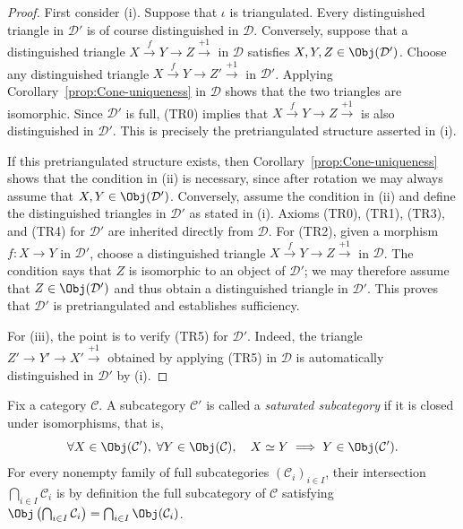 \begin{proof}
	First consider (i). Suppose that $\iota$ is triangulated. Every
	distinguished triangle in $\mathcal{D}'$ is of course distinguished in
	$\mathcal{D}$. Conversely, suppose that a distinguished triangle
	$X \xrightarrow{f} Y \to Z \xrightarrow{+1}$ in $\mathcal{D}$ satisfies
	$X, Y, Z \in \Obj(\mathcal{D}')$. Choose any distinguished triangle
	$X \xrightarrow{f} Y \to Z' \xrightarrow{+1}$ in $\mathcal{D}'$.
	Applying Corollary~\ref{prop:Cone-uniqueness} in $\mathcal{D}$ shows that
	the two triangles are isomorphic. Since $\mathcal{D}'$ is full, (TR0)
	implies that $X \xrightarrow{f} Y \to Z \xrightarrow{+1}$ is also
	distinguished in $\mathcal{D}'$. This is precisely the pretriangulated
	structure asserted in (i).

	If this pretriangulated structure exists, then
	Corollary~\ref{prop:Cone-uniqueness} shows that the condition in (ii) is
	necessary, since after rotation we may always assume that
	$X, Y \in \Obj(\mathcal{D}')$. Conversely, assume the condition in (ii)
	and define the distinguished triangles in $\mathcal{D}'$ as stated in
	(i). Axioms (TR0), (TR1), (TR3), and (TR4) for $\mathcal{D}'$ are
	inherited directly from $\mathcal{D}$. For (TR2), given a morphism
	$f: X \to Y$ in $\mathcal{D}'$, choose a distinguished triangle
	$X \xrightarrow{f} Y \to Z \xrightarrow{+1}$ in $\mathcal{D}$. The
	condition says that $Z$ is isomorphic to an object of $\mathcal{D}'$; we
	may therefore assume that $Z \in \Obj(\mathcal{D}')$ and thus obtain a
	distinguished triangle in $\mathcal{D}'$. This proves that $\mathcal{D}'$
	is pretriangulated and establishes sufficiency.

	For (iii), the point is to verify (TR5) for $\mathcal{D}'$. Indeed, the
	triangle $Z' \to Y' \to X' \xrightarrow{+1}$ obtained by applying (TR5)
	in $\mathcal{D}$ is automatically distinguished in $\mathcal{D}'$ by (i).
\end{proof}

\begin{convention}\label{con:saturated-intersection}
	Fix a category $\mathcal{C}$. A subcategory $\mathcal{C}'$ is called a
	\emph{saturated subcategory} if it is closed under isomorphisms, that is,
	\[ \forall X \in \Obj(\mathcal{C}'), \; \forall Y \in \Obj(\mathcal{C}), \quad X \simeq Y \implies Y \in \Obj(\mathcal{C}') . \]
	For every nonempty family of full subcategories
	$(\mathcal{C}_i)_{i \in I}$, their intersection
	$\bigcap_{i \in I} \mathcal{C}_i$ is by definition the full subcategory
	of $\mathcal{C}$ satisfying
	$\Obj\left( \bigcap_{i \in I} \mathcal{C}_i \right)
	= \bigcap_{i \in I} \Obj(\mathcal{C}_i)$.
\end{convention}

